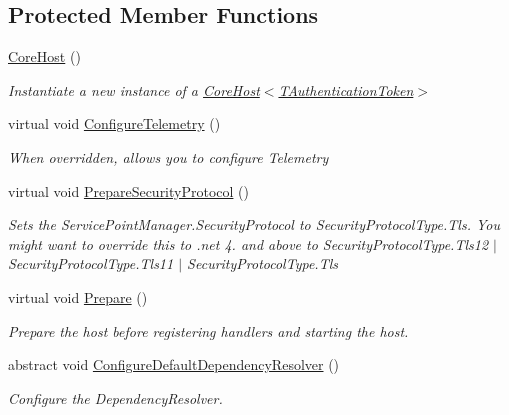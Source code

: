 \subsection*{Protected Member Functions}
\begin{DoxyCompactItemize}
\item 
\hyperlink{classCqrs_1_1Hosts_1_1CoreHost_aa1f88ad96bd3f1680e18550299cd6f69_aa1f88ad96bd3f1680e18550299cd6f69}{Core\+Host} ()
\begin{DoxyCompactList}\small\item\em Instantiate a new instance of a \hyperlink{classCqrs_1_1Hosts_1_1CoreHost_aa1f88ad96bd3f1680e18550299cd6f69_aa1f88ad96bd3f1680e18550299cd6f69}{Core\+Host$<$\+T\+Authentication\+Token$>$} \end{DoxyCompactList}\item 
virtual void \hyperlink{classCqrs_1_1Hosts_1_1CoreHost_a8035dd83f62ec6184854e7e833be5db9_a8035dd83f62ec6184854e7e833be5db9}{Configure\+Telemetry} ()
\begin{DoxyCompactList}\small\item\em When overridden, allows you to configure Telemetry \end{DoxyCompactList}\item 
virtual void \hyperlink{classCqrs_1_1Hosts_1_1CoreHost_a220ba43ac810c074c8881e8f598ff746_a220ba43ac810c074c8881e8f598ff746}{Prepare\+Security\+Protocol} ()
\begin{DoxyCompactList}\small\item\em Sets the Service\+Point\+Manager.\+Security\+Protocol to Security\+Protocol\+Type.\+Tls. You might want to override this to .net 4. and above to Security\+Protocol\+Type.\+Tls12 $\vert$ Security\+Protocol\+Type.\+Tls11 $\vert$ Security\+Protocol\+Type.\+Tls \end{DoxyCompactList}\item 
virtual void \hyperlink{classCqrs_1_1Hosts_1_1CoreHost_aa01932c1199967babe19c3059e86f513_aa01932c1199967babe19c3059e86f513}{Prepare} ()
\begin{DoxyCompactList}\small\item\em Prepare the host before registering handlers and starting the host. \end{DoxyCompactList}\item 
abstract void \hyperlink{classCqrs_1_1Hosts_1_1CoreHost_a9e6067f83498b6eca0cd7cdc175fd943_a9e6067f83498b6eca0cd7cdc175fd943}{Configure\+Default\+Dependency\+Resolver} ()
\begin{DoxyCompactList}\small\item\em Configure the Dependency\+Resolver. \end{DoxyCompactList}\item 

\end{DoxyCompactItemize}
